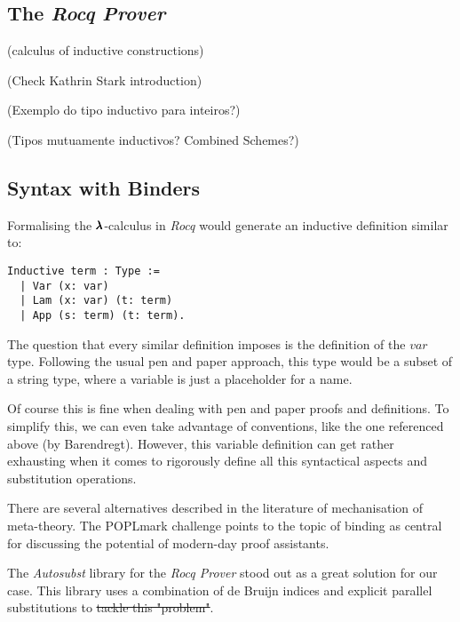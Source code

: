 \subsection{The \textit{Rocq Prover}}

(calculus of inductive constructions)

(Check Kathrin Stark introduction)

(Exemplo do tipo inductivo para inteiros?)

(Tipos mutuamente inductivos? Combined Schemes?)

\subsection{Syntax with Binders}

Formalising the $\pmb{\lambda}$-calculus in \textit{Rocq} would generate an inductive definition similar to:

\begin{lstlisting}[language=Coq]
  Inductive term : Type :=
  | Var (x: var)
  | Lam (x: var) (t: term)
  | App (s: term) (t: term).
\end{lstlisting}

The question that every similar definition imposes is the definition of the $var$ type. Following the usual pen and paper approach, this type would be a subset of a string type, where a variable is just a placeholder for a name.

Of course this is fine when dealing with pen and paper proofs and definitions. To simplify this, we can even take advantage of conventions, like the one referenced above (by Barendregt). 
However, this variable definition can get rather exhausting  when it comes to rigorously define all this syntactical aspects and substitution operations.

There are several alternatives described in the literature of mechanisation of meta-theory. 
The POPLmark challenge \cite{POPLmark} points to the topic of binding as central for discussing the potential of modern-day proof assistants.

The \textit{Autosubst} library for the \textit{Rocq Prover} stood out as a great solution for our case. 
This library uses a combination of de Bruijn indices and explicit parallel substitutions to \sout{tackle this "problem"}.

